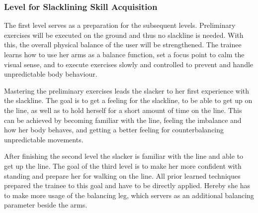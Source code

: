 \subsubsection{Level for Slacklining Skill Acquisition}
The first level serves as a preparation for the subsequent levels.
Preliminary exercises will be executed on the ground and thus no slackline is needed.
With this, the overall physical balance of the user will be strengthened.
The trainee learns how to use her arms as a balance function, set a focus point to calm the visual sense, and to execute exercises slowly and controlled to prevent and handle unpredictable body behaviour.

Mastering the preliminary exercises leads the slacker to her first experience with the slackline.
The goal is to get a feeling for the slackline, to be able to get up on the line, as well as to hold herself for a short amount of time on the line.
This can be achieved by becoming familiar with the line, feeling the imbalance and how her body behaves, and getting a better feeling for counterbalancing unpredictable movements.

After finishing the second level the slacker is familiar with the line and able to get up the line.
The goal of the third level is to make her more confident with standing and prepare her for walking on the line.
All prior learned techniques prepared the trainee to this goal and have to be directly applied.
Hereby she has to make more usage of the balancing leg, which servers as an additional balancing parameter beside the arms.


